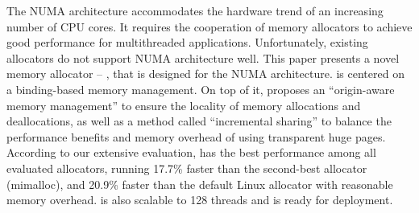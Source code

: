 The NUMA architecture accommodates the hardware trend of an increasing number of CPU cores. It requires the cooperation of memory allocators to achieve good performance for multithreaded applications. Unfortunately, existing allocators do not support NUMA architecture well.
This paper presents a novel memory allocator -- \NM{}, that is designed for the NUMA architecture. \NM{} is centered on a binding-based memory management. On top of it, \NM{} proposes an ``origin-aware memory management'' to ensure the locality of memory allocations and deallocations, as well as a method called ``incremental sharing'' to balance the performance benefits and memory overhead of using transparent huge pages.
According to our extensive evaluation, \NM{} has the best performance among all evaluated allocators, running 17.7\% faster than the second-best allocator (mimalloc), and 20.9\% faster than the default Linux allocator with reasonable memory overhead. 
\NM{} is also scalable to 128 threads and is ready for deployment.